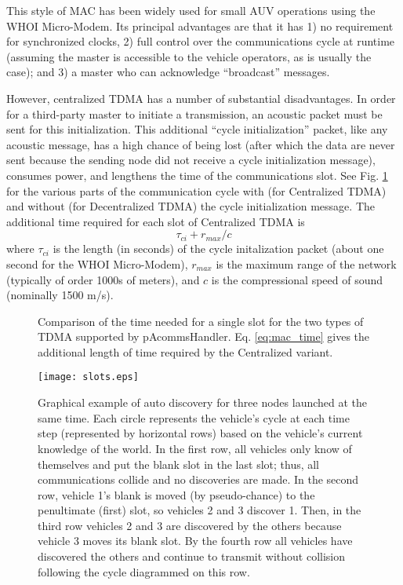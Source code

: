 This style of MAC has been widely used for small AUV operations using the WHOI Micro-Modem. Its principal advantages are that it has 1) no requirement for synchronized clocks, 2) full control over the communications cycle at runtime (assuming the master is accessible to the vehicle operators, as is usually the case); and 3) a master who can acknowledge ``broadcast'' messages. 

However, centralized TDMA has a number of substantial disadvantages. In order for a third-party master to initiate a transmission, an acoustic packet must be sent for this initialization. This additional ``cycle initialization'' packet, like any acoustic message, has a high chance of being lost (after which the data are never sent because the sending node did not receive a cycle initialization message), consumes power, and lengthens the time of the communications slot. See Fig. \ref{fig:slots} for the various parts of the communication cycle with (for Centralized TDMA) and without (for Decentralized TDMA) the cycle initialization message. The additional time required for each slot of Centralized TDMA is
\begin{equation}\label{eq:mac_time}
\tau_{ci} + r_{max}/c
\end{equation}
where $\tau_{ci}$ is the length (in seconds) of the cycle initalization packet (about one second for the WHOI Micro-Modem), $r_{max}$ is the maximum range of the network (typically of order 1000s of meters), and $c$ is the compressional speed of sound (nominally 1500 m/s).

\begin{figure}
	\centering
\centerline{\hfil
	}
\caption{Comparison of the time needed for a single slot for the two types of TDMA supported by pAcommsHandler. Eq. \ref{eq:mac_time} gives the additional length of time required by the Centralized variant.}
\label{fig:slots}
\end{figure}

\begin{figure}
\centering
\texttt{[image: slots.eps]}
\caption{Graphical example of auto discovery for three nodes launched at the same time. Each circle represents the vehicle's cycle at each time step (represented by horizontal rows) based on the vehicle's current knowledge of the world. In the first row, all vehicles only know of themselves and put the blank slot in the last slot; thus, all communications collide and no discoveries are made. In the second row, vehicle 1's blank is moved (by pseudo-chance) to the penultimate (first) slot, so vehicles 2 and 3 discover 1. Then, in the third row vehicles 2 and 3 are discovered by the others because vehicle 3 moves its blank slot. By the fourth row all vehicles have discovered the others and continue to transmit without collision following the cycle diagrammed on this row.} 
\label{fig:decentralized_cycles}
\end{figure}

